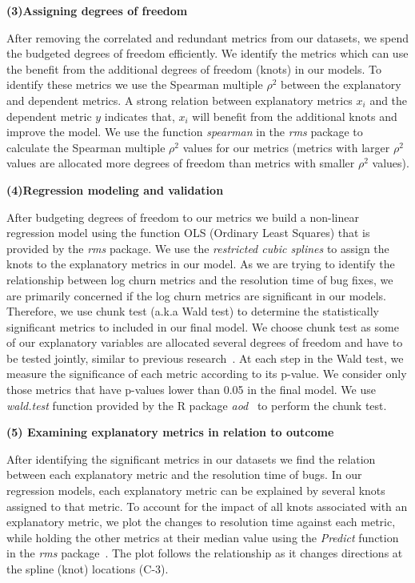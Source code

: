 \noindent \textbf{(3)Assigning degrees of freedom}


After removing the correlated and redundant metrics from our datasets, we spend the budgeted degrees of freedom efficiently. We identify the metrics which can use the benefit from the additional degrees of freedom (knots) in our models. To identify these metrics we use the Spearman multiple $\rho^{2}$ between the explanatory and dependent metrics. A strong relation between explanatory metrics $x_{i}$ and the dependent metric $y$ indicates that, $x_{i}$ will benefit from the additional knots and improve the model. We use the function \textsl{spearman} in the \textsl{rms} package to calculate the Spearman multiple $\rho^{2}$ values for our metrics (metrics with larger $\rho^{2}$ values are allocated more degrees of freedom than metrics with smaller $\rho^{2}$ values).

\noindent \textbf{(4)Regression modeling and validation}

After budgeting degrees of freedom to our metrics we build a non-linear regression model using the function OLS (Ordinary Least Squares) that is provided by the \textsl{rms} package. We use the \textsl{restricted cubic splines} to assign the knots to the explanatory metrics in our model. 
As we are trying to identify the relationship between log churn metrics and the resolution time of bug fixes, we are primarily concerned if the log churn metrics are significant in our models. Therefore, we use chunk test (a.k.a Wald test) to determine the statistically significant metrics to included in our final model. We choose chunk test as some of our explanatory variables are allocated several degrees of freedom and have to be tested jointly, similar to previous research~\cite{ShaneOLS}. At each step in the Wald test, we measure the significance of each metric according to its p-value. We consider only those metrics that have p-values lower than 0.05 in the final model. We use \textsl{wald.test} function provided by the R package \emph{aod}~\cite{waldtest} to perform the chunk test.  


\noindent \textbf{(5) Examining explanatory metrics in relation to outcome}

After identifying the significant metrics in our datasets we find the relation between each explanatory metric and the resolution time of bugs. In our regression models, each explanatory metric can be explained by several knots assigned to that metric. To account for the impact of all knots associated with an explanatory metric, we plot the changes to resolution time against each metric, while holding the other metrics at their median value using the \emph{Predict} function in the \emph{rms} package~\cite{rmsPackage}. The plot follows the relationship as it changes directions at the spline (knot) locations (C-3). 

